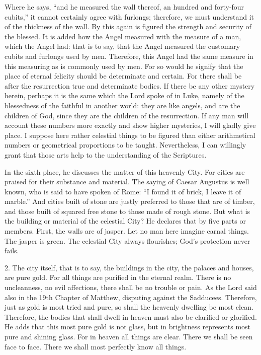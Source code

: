 Where he says, “and he measured the wall thereof, an hundred and forty-four cubits,” it cannot certainly agree with furlongs; therefore, we must understand it of the thickness of the wall. By this again is figured the strength and security of the blessed. It is added how the Angel measured with the measure of a man, which the Angel had: that is to say, that the Angel measured the customary cubits and furlongs used by men. Therefore, this Angel had the same measure in this measuring as is commonly used by men. For so would he signify that the place of eternal felicity should be determinate and certain. For there shall be after the resurrection true and determinate bodies. If there be any other mystery herein, perhaps it is the same which the Lord spoke of in Luke, namely of the blessedness of the faithful in another world: they are like angels, and are the children of God, since they are the children of the resurrection. If any man will account these numbers more exactly and show higher mysteries, I will gladly give place. I suppose here rather celestial things to be figured than either arithmetical numbers or geometrical proportions to be taught. Nevertheless, I can willingly grant that those arts help to the understanding of the Scriptures.

In the sixth place, he discusses the matter of this heavenly City. For cities are praised for their substance and material. The saying of Caesar Augustus is well known, who is said to have spoken of Rome: “I found it of brick, I leave it of marble.” And cities built of stone are justly preferred to those that are of timber, and those built of squared free stone to those made of rough stone. But what is the building or material of the celestial City? He declares that by five parts or members. First, the walls are of jasper. Let no man here imagine carnal things. The jasper is green. The celestial City always flourishes; God’s protection never fails.

2. The city itself, that is to say, the buildings in the city, the palaces and houses, are pure gold. For all things are purified in the eternal realm. There is no uncleanness, no evil affections, there shall be no trouble or pain. As the Lord said also in the 19th Chapter of Matthew, disputing against the Sadducees. Therefore, just as gold is most tried and pure, so shall the heavenly dwelling be most clean. Therefore, the bodies that shall dwell in heaven must also be clarified or glorified. He adds that this most pure gold is not glass, but in brightness represents most pure and shining glass. For in heaven all things are clear. There we shall be seen face to face. There we shall most perfectly know all things.

